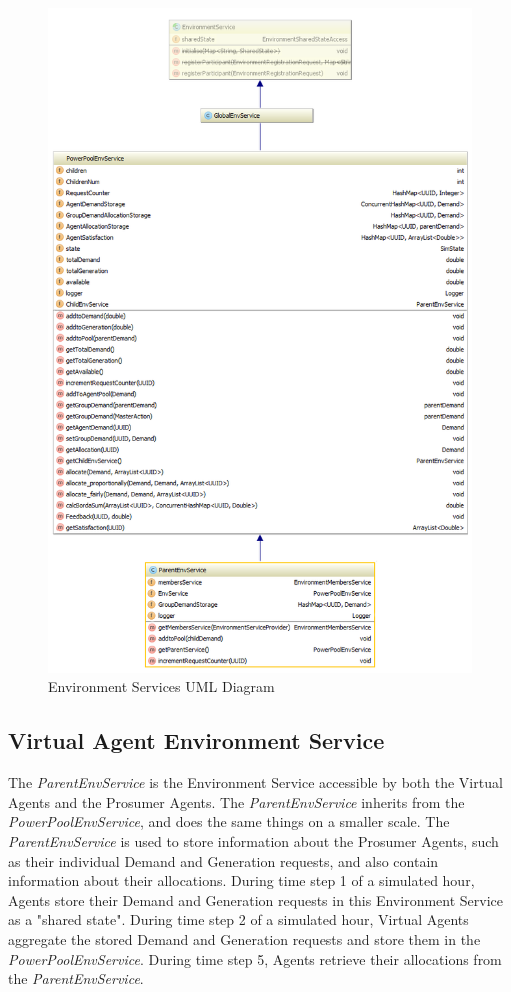 \begin{figure}[!h]
	\centering
	\includegraphics[scale=0.5]{Images/EnvironmentUML-2.png}
	\caption{Environment Services UML Diagram}
	\label{fig:ServiceUML2}
\end{figure}

\subsection*{Virtual Agent Environment Service}
The \textit{ParentEnvService} is the Environment Service accessible by both the Virtual Agents and the Prosumer Agents. The \textit{ParentEnvService} inherits from the \textit{PowerPoolEnvService}, and does the same things on a smaller scale. The \textit{ParentEnvService} is used to store information about the Prosumer Agents, such as their individual Demand and Generation requests, and also contain information about their allocations. During time step 1 of a simulated hour, Agents store their Demand and Generation requests in this Environment Service as a "shared state". During time step 2 of a simulated hour, Virtual Agents aggregate the stored Demand and Generation requests and store them in the \textit{PowerPoolEnvService}. During time step 5, Agents retrieve their allocations from the \textit{ParentEnvService}.

